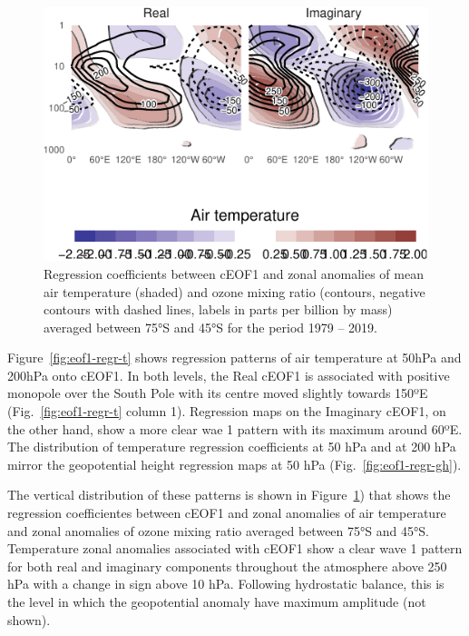 \documentclass[smallextended]{svjour3}       %
\begin{document}
\begin{figure}
\centering
\includegraphics{../figures/t-vertical-1.pdf}
\caption{\label{fig:t-vertical}Regression coefficients between cEOF1 and zonal anomalies of mean air temperature (shaded) and ozone mixing ratio (contours, negative contours with dashed lines, labels in parts per billion by mass) averaged between 75°S and 45°S for the period 1979 -- 2019.}
\end{figure}

Figure~\ref{fig:eof1-regr-t} shows regression patterns of air temperature at 50hPa and 200hPa onto cEOF1. In both levels, the Real cEOF1 is associated with positive monopole over the South Pole with its centre moved slightly towards 150ºE (Fig.~\ref{fig:eof1-regr-t} column 1). Regression maps on the Imaginary cEOF1, on the other hand, show a more clear wae 1 pattern with its maximum around 60ºE. The distribution of temperature regression coefficients at 50 hPa and at 200 hPa mirror the geopotential height regression maps at 50 hPa (Fig.~\ref{fig:eof1-regr-gh}).

The vertical distribution of these patterns is shown in Figure~\ref{fig:t-vertical}) that shows the regression coefficientes between cEOF1 and zonal anomalies of air temperature and zonal anomalies of ozone mixing ratio averaged between 75°S and 45°S. Temperature zonal anomalies associated with cEOF1 show a clear wave 1 pattern for both real and imaginary components throughout the atmosphere above 250 hPa with a change in sign above 10 hPa. Following hydrostatic balance, this is the level in which the geopotential anomaly have maximum amplitude (not shown).
\end{document}
